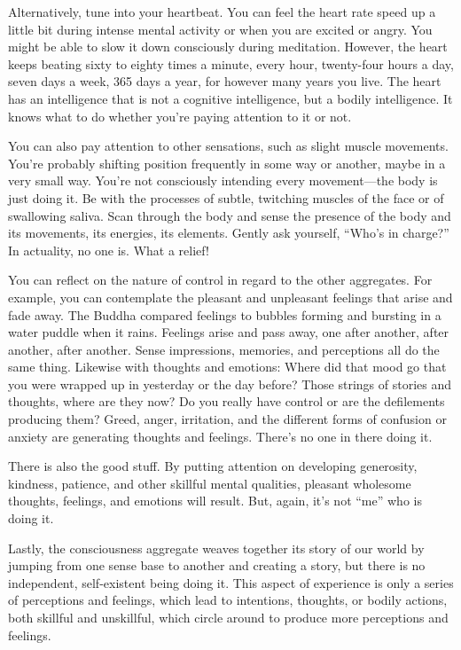 Alternatively, tune into your heartbeat. You can feel the heart rate speed up a little bit during intense mental activity or when you are excited or angry. You might be able to slow it down consciously during meditation. However, the heart keeps beating sixty to eighty times a minute, every hour, twenty-four hours a day, seven days a week, 365 days a year, for however many years you live. The heart has an intelligence that is not a cognitive intelligence, but a bodily intelligence. It knows what to do whether you're paying attention to it or not.

You can also pay attention to other sensations, such as slight muscle movements. You're probably shifting position frequently in some way or another, maybe in a very small way. You're not consciously intending every movement---the body is just doing it. Be with the processes of subtle, twitching muscles of the face or of swallowing saliva. Scan through the body and sense the presence of the body and its movements, its energies, its elements. Gently ask yourself, ``Who's in charge?'' In actuality, no one is. What a relief!

You can reflect on the nature of control in regard to the other aggregates. For example, you can contemplate the pleasant and unpleasant feelings that arise and fade away. The Buddha compared feelings to bubbles forming and bursting in a water puddle when it rains. Feelings arise and pass away, one after another, after another, after another. Sense impressions, memories, and perceptions all do the same thing. Likewise with thoughts and emotions: Where did that mood go that you were wrapped up in yesterday or the day before? Those strings of stories and thoughts, where are they now? Do you really have control or are the defilements producing them? Greed, anger, irritation, and the different forms of confusion or anxiety are generating thoughts and feelings. There's no one in there doing it.

There is also the good stuff. By putting attention on developing generosity, kindness, patience, and other skillful mental qualities, pleasant wholesome thoughts, feelings, and emotions will result. But, again, it's not ``me'' who is doing it.

Lastly, the consciousness aggregate weaves together its story of our world by jumping from one sense base to another and creating a story, but there is no independent, self-existent being doing it. This aspect of experience is only a series of perceptions and feelings, which lead to intentions, thoughts, or bodily actions, both skillful and unskillful, which circle around to produce more perceptions and feelings.

